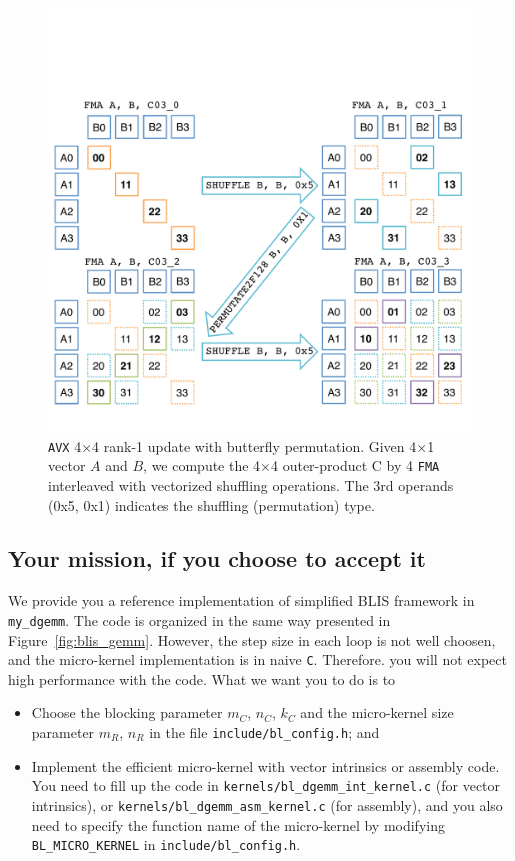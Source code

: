 \begin{figure}
\begin{center}
	\includegraphics[width=5in]{figures/avx_permute.pdf}
\end{center}
\caption{{\tt AVX} 4$\times$4 rank-1 update with butterfly permutation. Given 4$\times$1 vector $A$ and $B$, we compute the 4$\times$4 outer-product C by 4 {\tt FMA} interleaved with vectorized shuffling operations. The 3rd operands (0x5, 0x1) indicates the shuffling (permutation) type.}
\label{fig:permutation}
\end{figure}

\subsection{Your mission, if you choose to accept it}
We provide you a reference implementation of simplified BLIS framework in {\tt my\_dgemm}. The code is organized in the same way presented in Figure~\ref{fig:blis_gemm}. However, the step size in each loop is not well choosen, and the micro-kernel implementation is in naive {\tt C}. Therefore. you will not expect high performance with the code. What we want you to do is to 
\begin{itemize}
\item Choose the blocking parameter $ m_C $, $ n_C $, $ k_C $ and the micro-kernel size parameter $ m_R $, $ n_R $ in the file {\tt include/bl\_config.h}; and
\item Implement the efficient micro-kernel with vector intrinsics or assembly code. You need to fill up the code in {\tt kernels/bl\_dgemm\_int\_kernel.c} (for vector intrinsics), or {\tt kernels/bl\_dgemm\_asm\_kernel.c} (for assembly), and you also need to specify the function name of the micro-kernel by modifying {\tt BL\_MICRO\_KERNEL} in {\tt include/bl\_config.h}.
\end{itemize}

